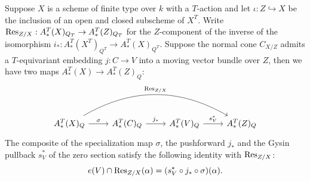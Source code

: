 \begin{prop}\label{rl-000R}\label{prop:edidin-graham-residue-identity}
  Suppose \(X\) is a scheme of finite type over \(k\) with a \(T\)-action and let \(\iota:Z\hookrightarrow X\) be the inclusion of an open and closed subscheme of \(X^T\). Write \(\operatorname{Res}_{Z/X}:A^T_*(X)_{Q_T}\to A^T_*(Z)_{Q_T}\) for the \(Z\)-component of the inverse of the isomorphism \(i_*:A^T_*(X^T)_{Q^T}\to A^T_*(X)_{Q^T}\). Suppose the normal cone \(C_{X/Z}\) admits a \(T\)-equivariant embedding \(j:C\to V\) into a moving vector bundle over \(Z\), then we have two maps \(A^T_*(X) \to A^T_*(Z)_{Q}\):
  \begin{equation*}
    \begin{tikzcd}
      A_*^T(X)_{Q} \arrow[rrr, bend left=30,"\Res_{Z/X}"]\arrow[r,"\sigma"] & A^T_*(C)_{Q} \arrow[r, "j_*"] & A^T_*(V)_{Q} \arrow[r,"s^*_V"] & A^T_*(Z)_Q
    \end{tikzcd}
  \end{equation*}
  The composite of the specialization map \(\sigma\), the pushforward \(j_*\) and the Gysin pullback \(s^*_V\) of the zero section satisfy the following identity with \(\operatorname{Res}_{Z/X}\):
  \begin{equation}\label{eqn:residue-identity}
    e(V) \cap \operatorname{Res}_{Z/X}(\alpha) = (s^*_V\circ j_*\circ \sigma)(\alpha).
  \end{equation}
\end{prop}
